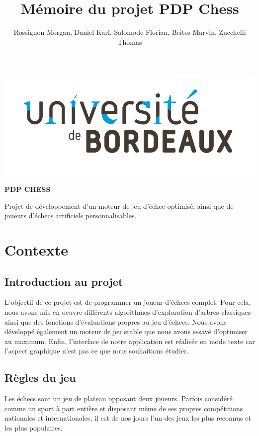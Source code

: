 \documentclass{article}
\title{\textbf{Mémoire du projet PDP Chess}}
\author{Rossignon Morgan, Daniel Karl, Salomode Florian, Beites Marvin, Zucchelli Thomas}
\begin{document}
\maketitle
\centerline{\includegraphics[scale = 0.5]{img/Universite Bordeaux RVB-02.jpg}}

\huge \centerline{\textbf{PDP CHESS}}

\medskip
Projet de développement d'un moteur de jeu d'échec optimisé, ainsi que de joueurs d'échecs artificiels personnalisables.
\normalsize
\newpage

\tableofcontents
\newpage

\section{Contexte}

\subsection{Introduction au projet}

L'objectif de ce projet est de programmer un joueur d'échecs complet.
\newline
Pour cela, nous avons mis en oeuvre différents algorithmes d'exploration d'arbres classiques ainsi que des fonctions d'évaluations propres au jeu d'échecs. Nous avons développé également un moteur de jeu stable que nous avons essayé d'optimiser au maximum.
\newline
Enfin, l'interface de notre application est réalisée en mode texte car l'aspect graphique n'est pas ce que nous souhaitions étudier.

\subsection{Règles du jeu}

Les échecs sont un jeu de plateau opposant deux joueurs. Parfois considéré comme un sport à part entière et disposant même de ses propres compétitions nationales et internationales, il est de nos jours l'un des jeux les plus reconnus et les plus populaires.
\end{document}
